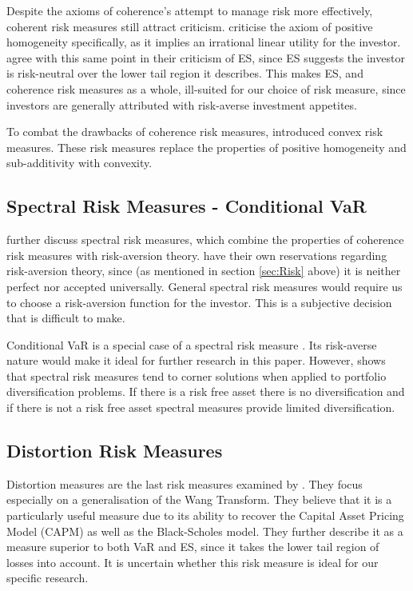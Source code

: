 \documentclass[12pt,a4paper]{article}
\begin{document}
Despite the axioms of coherence's attempt to manage risk more effectively, coherent risk measures still attract criticism. \cite{CHEN20111777} criticise the axiom of positive homogeneity specifically, as it implies an irrational linear utility for the investor. \cite{dowd2006after} agree with this same point in their criticism of ES, since ES suggests the investor is risk-neutral over the lower tail region it describes. This makes ES, and coherence risk measures as a whole, ill-suited for our choice of risk measure, since investors are generally attributed with risk-averse investment appetites.

To combat the drawbacks of coherence risk measures, \cite{Föllmer2002} introduced convex risk measures. These risk measures replace the properties of positive homogeneity and sub-additivity with convexity. 

\subsection{Spectral Risk Measures - Conditional VaR}
\label{subsec:Spec}

\cite{dowd2006after} further discuss spectral risk measures, which combine the properties of coherence risk measures with risk-aversion theory. \cite{dowd2006after} have their own reservations regarding risk-aversion theory, since (as mentioned in section \ref{sec:Risk} above) it is neither perfect nor accepted universally. General spectral risk measures would require us to choose a risk-aversion function for the investor. This is a subjective decision that is difficult to make.

Conditional VaR is a special case of a spectral risk measure \citep{BRANDTNER20135526}. Its risk-averse nature would make it ideal for further research in this paper. However, \cite{BRANDTNER20135526} shows that spectral risk measures tend to corner solutions when applied to portfolio diversification problems. If there is a risk free asset there is no diversification and if there is not a risk free asset spectral measures provide limited diversification.

\subsection{Distortion Risk Measures}
\label{subsec:Distortion} 

Distortion measures are the last risk measures examined by \cite{dowd2006after}. They focus especially on a generalisation of the Wang Transform. They believe that it is a particularly useful measure due to its ability to recover the Capital Asset Pricing Model (CAPM) as well as the Black-Scholes model. They further describe it as a measure superior to both VaR and ES, since it takes the lower tail region of losses into account. It is uncertain whether this risk measure is ideal for our specific research.
\end{document}
